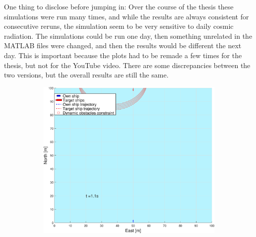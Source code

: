 One thing to disclose before jumping in: Over the course of the thesis these simulations were run many times, and while the results are always consistent
for consecutive reruns, the simulation seem to be very sensitive to daily cosmic radiation. The simulations could be run one day, then something unrelated in the
MATLAB files were changed, and then the results would be different the next day. This is important because the plots had to be remade a few times for the
thesis, but not for the YouTube video. There are some discrepancies between the two versions, but the overall results are still the same.

\clearpage
\begin{figure}[ht!] %
    \begin{subfigure}[b]{0.49\textwidth}
        \centering
        \includegraphics[width=\textwidth]{Images/Figures/enkel_HO/_Simple_0fig1_time=1}
        \subcaption{}

\end{subfigure}
\end{figure}
